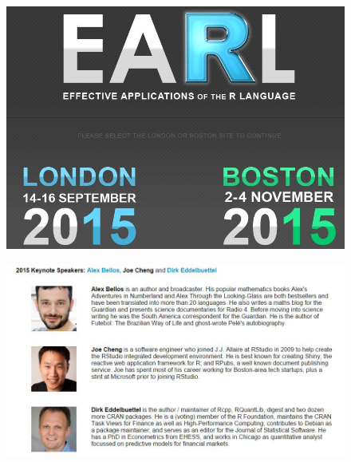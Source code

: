 \documentclass{beamer}
\begin{document}
\begin{frame}
	\begin{figure}
		\centering
		\includegraphics[width=0.88\linewidth]{earlconf1}
		
	\end{figure}
	
\end{frame}
\begin{frame}
	\begin{figure}
		\centering
		\includegraphics[width=1.11\linewidth]{earlspeakers}
		
	\end{figure}
	
\end{frame}
\end{document}
